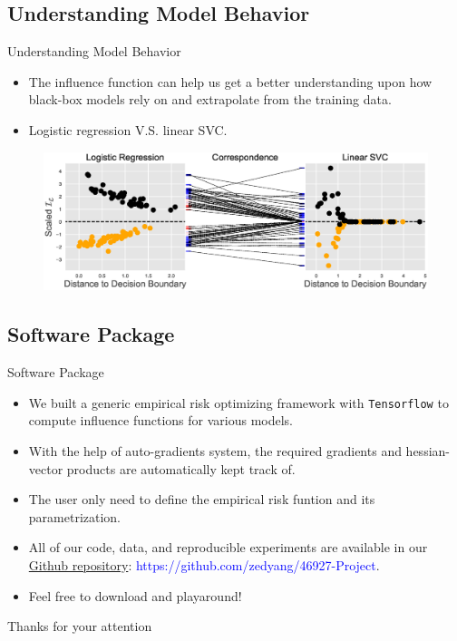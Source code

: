 \documentclass[blue]{beamer}
\begin{document}
\subsection{Understanding Model Behavior}
\begin{frame}{Understanding Model Behavior}{}
\begin{itemize}
  \item The influence function can help us get a better understanding upon how black-box models rely on and extrapolate from the training data.
  \item Logistic regression V.S. linear SVC.
\end{itemize}
\begin{figure}[ht]
\vskip 0.0in
\begin{center}
\centerline{\includegraphics[width=4.5in]{fig-app1}}
\vskip -0.1in
\label{logit_components}
\end{center}
\vskip -0.25in
\end{figure}

\end{frame}

\subsection{Software Package}
\begin{frame}{Software Package}{}
\begin{itemize}
  \item We built a generic empirical risk optimizing framework with \texttt{Tensorflow} to compute influence functions for various models.
  \item With the help of auto-gradients system, the required gradients and hessian-vector products are automatically kept track of. 
  \item The user only need to define the empirical risk funtion and its parametrization. 
  \item All of our code, data, and reproducible experiments are available in our \href{https://github.com/zedyang/46927-Project}{Github repository}: \textcolor{blue}{https://github.com/zedyang/46927-Project}.
  \item Feel free to download and playaround!
\end{itemize}
\end{frame}

\frame
{

\begin{center}
\LARGE
Thanks for your attention
\end{center}

}
\end{document}
